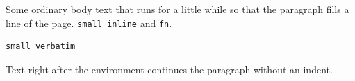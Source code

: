 \documentclass{article}
\begin{document}
Some ordinary body text that runs for a little while so that the paragraph fills a line of the page. {\small \verb|small inline|} and {\footnotesize\verb|fn|}.
\par
\begin{small}
\begin{verbatim}
small verbatim
\end{verbatim}
\end{small}
Text right after the environment continues the paragraph without an indent.
\end{document}
